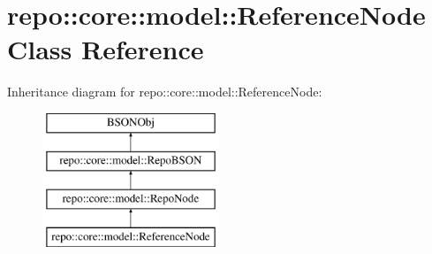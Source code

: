 \hypertarget{classrepo_1_1core_1_1model_1_1_reference_node}{}\section{repo\+:\+:core\+:\+:model\+:\+:Reference\+Node Class Reference}
\label{classrepo_1_1core_1_1model_1_1_reference_node}
Inheritance diagram for repo\+:\+:core\+:\+:model\+:\+:Reference\+Node\+:\begin{figure}[H]
\begin{center}
\leavevmode
\includegraphics[height=4.000000cm]{classrepo_1_1core_1_1model_1_1_reference_node}
\end{center}
\end{figure}
